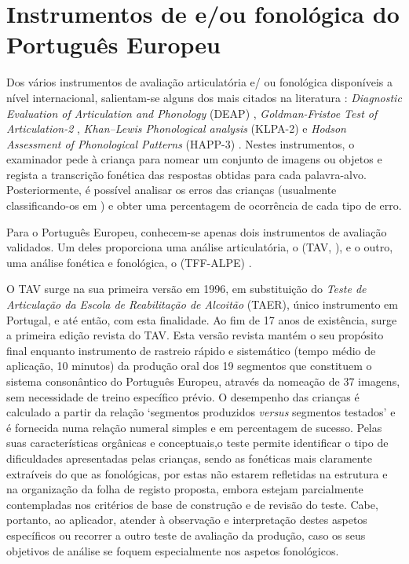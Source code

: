 \documentclass[output=paper]{LSP/langsci}
\begin{document}
\section{Instrumentos de  e/ou fonológica do Português Europeu}
\label{sec:lousada_instru_pt}

Dos vários instrumentos de avaliação articulatória e/ ou fonológica disponíveis a nível internacional, salientam-se alguns dos mais citados na literatura \citep{bowen2015}: \textit{Diagnostic Evaluation of Articulation and Phonology} (DEAP) \cite{dodd_etal2002}, \textit{Goldman-Fristoe Test of Articulation-2} \citep{goldmanfristoe2000}, \textit{Khan–Lewis Phonological analysis} (KLPA-2) \citep{khanlewis2002} e \textit{Hodson Assessment of Phonological Patterns} (HAPP-3) \citep{hodson2004}. Nestes instrumentos, o examinador pede à criança para nomear um conjunto de imagens ou objetos e regista a transcrição fonética das respostas obtidas para cada palavra-alvo. Posteriormente, é possível analisar os erros das crianças (usualmente classificando-os em ) e obter uma percentagem de ocorrência de cada tipo de erro.

Para o Português Europeu, conhecem-se apenas dois instrumentos de avaliação validados. Um deles proporciona uma análise articulatória, o \textit{} (TAV, \citealt{guimaraes_etal2014}), e o outro, uma análise fonética e fonológica, o \textit{} (TFF-ALPE) \citep{mendes_etal2013}. 

O TAV surge na sua primeira versão em 1996, em substituição do \textit{Teste de Articulação da Escola de Reabilitação de Alcoitão} (TAER), único instrumento em Portugal, e até então, com esta finalidade. Ao fim de 17 anos de existência, surge a primeira edição revista do TAV. Esta versão revista mantém o seu propósito final enquanto instrumento de rastreio rápido e sistemático (tempo médio de aplicação, 10 minutos) da produção oral dos 19 segmentos que constituem o sistema consonântico do Português Europeu, através da nomeação de 37 imagens, sem necessidade de treino específico prévio. O desempenho das crianças é calculado a partir da relação ‘segmentos produzidos \textit{versus} segmentos testados’ e é fornecida numa relação numeral simples e em percentagem de sucesso. Pelas suas características orgânicas e conceptuais,\largerpage o teste permite identificar o tipo de dificuldades apresentadas pelas crianças, sendo as fonéticas mais claramente extraíveis do que as fonológicas, por estas não estarem refletidas na estrutura e na organização da folha de registo proposta, embora estejam parcialmente contempladas nos critérios de base de construção e de revisão do teste. Cabe, portanto, ao aplicador, atender à observação e interpretação destes aspetos específicos ou recorrer a outro teste de avaliação da produção, caso os seus objetivos de análise se foquem especialmente nos aspetos fonológicos.
\end{document}
